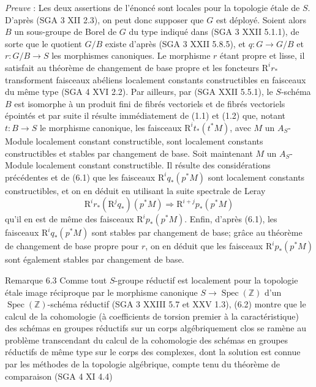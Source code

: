 \emph{Preuve} : Les deux assertions de l'énoncé sont locales pour la topologie étale de $S$. D'après (SGA 3 XII 2.3), on peut donc supposer que $G$ est déployé. Soient alors $B$ un sous-groupe de Borel de $G$ du type indiqué dans (SGA 3 XXII 5.1.1), de sorte que le quotient $G/B$ existe d'après (SGA 3 XXII 5.8.5), et $q:G\to G/B$ et $r:G/B\to S$ les morphismes canoniques. Le morphisme $r$ étant propre et lisse, il satisfait au théorème de changement de base propre et les foncteurs $\mathrm{R}^ir_*$ transforment faisceaux abéliens localement constants constructibles en faisceaux du même type (SGA 4 XVI 2.2). Par ailleurs, par (SGA  XXII 5.5.1), le $S$-schéma $B$ est isomorphe à un produit fini de fibrés vectoriels et de fibrés vectoriels épointés et par
suite il résulte immédiatement de (1.1) et (1.2) que, notant $t:B\to S$ le morphisme canonique, les 
faisceaux $\mathrm{R}^it_*(t^*M)$, avec $M$ un $A_S$-Module localement constant constructible, sont localement constants constructibles et stables par changement de base. Soit maintenant $M$ un $A_S$-Module localement constant constructible. Il résulte des considérations précédentes et de (6.1) que les faisceaux $\mathrm{R}^iq_*(p^*M)$ sont localement constants constructibles, et on en déduit en utilisant la suite spectrale de Leray
\[
\mathrm{R}^ir_*(\mathrm{R}^jq_*)(p^*M)\Rightarrow \mathrm{R}^{i+j}p_*(p^*M)
\]
qu'il en est de même des faisceaux $\mathrm{R}^ip_*(p^*M)$. Enfin, d'après (6.1), les faisceaux $\mathrm{R}^iq_*(p^*M)$ sont stables par changement de base; grâce au théorème de changement de base propre pour $r$, on en déduit que les faisceaux $\mathrm{R}^ip_*(p^*M)$ sont également stables par changement de base.

\begin{statement}{Remarque 6.3}
Comme tout $S$-groupe réductif est localement pour la topologie étale image réciproque par le morphisme canonique $S\to\operatorname{Spec}(\mathbb{Z})$ d'un $\operatorname{Spec}(\mathbb{Z})$-schéma réductif (SGA 3 XXIII 5.7 et XXV 1.3), (6.2) montre que le calcul de la cohomologie (à coefficients de torsion premier à la caractéristique) des schémas en groupes réductifs sur un corps algébriquement clos se ramène au problème transcendant du calcul de la cohomologie des schémas en groupes réductifs de même type sur le corps des complexes, dont la solution est connue par les méthodes de la topologie algébrique, compte tenu du théorème de comparaison (SGA 4 XI 4.4)
\end{statement}

